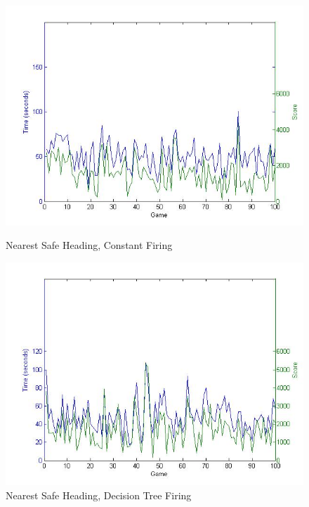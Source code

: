 \documentclass[10pt,final,conference]{IEEEtran}
\begin{document}
\begin{figure}[ht]
\centering
\begin{minipage}[b]{0.45\linewidth}
\includegraphics[width=1\textwidth]{nearestConstant}
\caption{Nearest Safe Heading, Constant Firing}
\label{fig:nearestConstant}
\end{minipage}
\quad
\begin{minipage}[b]{0.45\linewidth}
\includegraphics[width=1\textwidth]{nearestDecision}
\caption{Nearest Safe Heading, Decision Tree Firing}
\label{fig:nearestDecision}
\end{minipage}
\end{figure}
\end{document}
